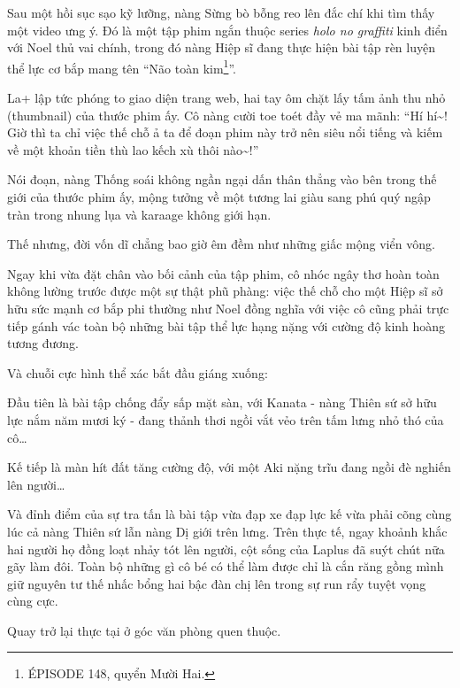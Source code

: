 \documentclass[../main.tex]{subfiles}
\begin{document}

Sau một hồi sục sạo kỹ lưỡng, nàng Sừng bò bỗng reo lên đắc chí khi tìm thấy một video ưng ý. Đó là một tập phim ngắn thuộc series \textit{holo no graffiti} kinh điển với Noel thủ vai chính, trong đó nàng Hiệp sĩ đang thực hiện bài tập rèn luyện thể lực cơ bắp mang tên ``Não toàn kim\footnote{{\flaregothic ÉPISODE 148}, quyển Mười Hai.}''.

La+ lập tức phóng to giao diện trang web, hai tay ôm chặt lấy tấm ảnh thu nhỏ (thumbnail) của thước phim ấy. Cô nàng cười toe toét đầy vẻ ma mãnh: ``Hí hí\~{}! Giờ thì ta chỉ việc thế chỗ ả ta để đoạn phim này trở nên siêu nổi tiếng và kiếm về một khoản tiền thù lao kếch xù thôi nào\~{}!''

Nói đoạn, nàng Thống soái không ngần ngại dấn thân thẳng vào bên trong thế giới của thước phim ấy, mộng tưởng về một tương lai giàu sang phú quý ngập tràn trong nhung lụa và karaage không giới hạn.

Thế nhưng, đời vốn dĩ chẳng bao giờ êm đềm như những giấc mộng viển vông.

Ngay khi vừa đặt chân vào bối cảnh của tập phim, cô nhóc ngây thơ hoàn toàn không lường trước được một sự thật phũ phàng: việc thế chỗ cho một Hiệp sĩ sở hữu sức mạnh cơ bắp phi thường như Noel đồng nghĩa với việc cô cũng phải trực tiếp gánh vác toàn bộ những bài tập thể lực hạng nặng với cường độ kinh hoàng tương đương.

Và chuỗi cực hình thể xác bắt đầu giáng xuống:

Đầu tiên là bài tập chống đẩy sấp mặt sàn, với Kanata - nàng Thiên sứ sở hữu lực nắm năm mươi ký - đang thảnh thơi ngồi vắt vẻo trên tấm lưng nhỏ thó của cô\dots


Kế tiếp là màn hít đất tăng cường độ, với một Aki nặng trĩu đang ngồi đè nghiến lên người\dots


Và đỉnh điểm của sự tra tấn là bài tập vừa đạp xe đạp lực kế vừa phải cõng cùng lúc cả nàng Thiên sứ lẫn nàng Dị giới trên lưng. Trên thực tế, ngay khoảnh khắc hai người họ đồng loạt nhảy tót lên người, cột sống của Laplus đã suýt chút nữa gãy làm đôi. Toàn bộ những gì cô bé có thể làm được chỉ là cắn răng gồng mình giữ nguyên tư thế nhấc bổng hai bậc đàn chị lên trong sự run rẩy tuyệt vọng cùng cực.

\ct

Quay trở lại thực tại ở góc văn phòng quen thuộc.
\end{document}
